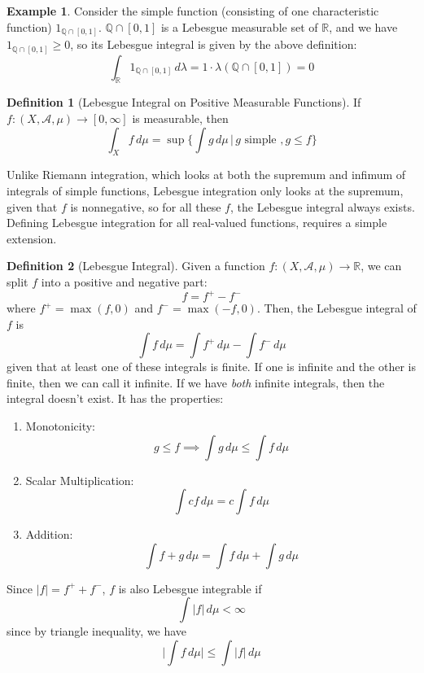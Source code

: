 \documentclass{article}
\theoremstyle{definition}
\newtheorem{example}{Example}[section]
\theoremstyle{remark}
\theoremstyle{definition}
\newtheorem{definition}{Definition}[section]
\begin{document}
\begin{example}
Consider the simple function (consisting of one characteristic function) $1_{\mathbb{Q} \cap [0, 1]}$. $\mathbb{Q} \cap [0, 1]$ is a Lebesgue measurable set of $\mathbb{R}$, and we have $1_{\mathbb{Q} \cap [0, 1]} \geq 0$, so its Lebesgue integral is given by the above definition: 
\[\int_{\mathbb{R}} 1_{\mathbb{Q} \cap [0, 1]} \, d\lambda = 1 \cdot \lambda(\mathbb{Q} \cap [0, 1]) = 0\]
\end{example}

\begin{definition}[Lebesgue Integral on Positive Measurable Functions]
If $f: (X, \mathcal{A}, \mu) \longrightarrow [0, \infty]$ is measurable, then 
\[\int_X f \, d\mu = \sup \Big\{ \int g\, d\mu \,\Big|\, g \text{ simple }, g \leq f\Big\}\]
\end{definition}

Unlike Riemann integration, which looks at both the supremum and infimum of integrals of simple functions, Lebesgue integration only looks at the supremum, given that $f$ is nonnegative, so for all these $f$, the Lebesgue integral always exists. Defining Lebesgue integration for all real-valued functions, requires a simple extension. 

\begin{definition}[Lebesgue Integral]
Given a function $f: (X, \mathcal{A}, \mu) \longrightarrow \mathbb{R}$, we can split $f$ into a positive and negative part: 
\[f = f^+ - f^-\]
where $f^+ = \max(f, 0)$ and $f^- = \max(-f, 0)$. Then, the Lebesgue integral of $f$ is 
\[\int f \, d \mu = \int f^+ \, d\mu - \int f^- \, d\mu\]
given that at least one of these integrals is finite. If one is infinite and the other is finite, then we can call it infinite. If we have \textit{both} infinite integrals, then the integral doesn't exist. It has the properties: 
\begin{enumerate}
    \item Monotonicity: 
    \[g \leq f \implies \int g \, d\mu \leq \int f\, d\mu\]
    \item Scalar Multiplication: 
    \[\int c f \, d\mu = c \int f \, d\mu\]
    \item Addition:
    \[\int f + g \, d\mu = \int f \,d\mu + \int g \,d\mu\]
\end{enumerate}
\end{definition}

Since $|f| = f^+ + f^-$, $f$ is also Lebesgue integrable if 
\[\int |f| \, d\mu < \infty \]
since by triangle inequality, we have 
\[\bigg| \int f \, d\mu \bigg| \leq \int |f| \, d \mu\]
\end{document}
